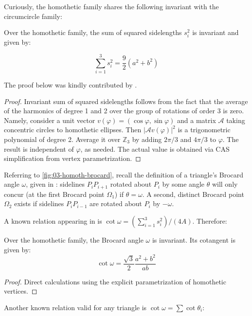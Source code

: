 Curiously, the homothetic family shares the following invariant with the circumcircle family:

\begin{proposition}
Over the homothetic family, the sum of squared sidelengths $s_i^2$ is invariant and given by:
	
\[ \sum_{i=1}^3 s_i^2=\frac{9}{2} \left(a^{2}+b^{2}\right) \]
\end{proposition}

The proof below was kindly contributed by  \cite{sergei2020-private-sidelengths}.

\begin{proof}
Invariant sum of squared sidelengths follows from the fact that the average of the harmonics of degree 1 and 2 over the group of rotations of order 3 is zero. Namely, consider a unit vector $v(\varphi)=(\cos \varphi, \sin \varphi)$ and a matrix $\mathcal{A}$ taking concentric circles to homothetic ellipses. Then $|\mathcal{A}v(\varphi)|^2$ is a trigonometric polynomial of degree 2. Average it over $\mathbb{Z}_3$ by adding $2\pi/3$ and $4\pi/3$ to $\varphi$. The result is independent of $\varphi$, as needed. The actual value is obtained via CAS simplification from vertex parametrization.
\end{proof}

Referring to \cref{fig:03-homoth-brocard}, recall the definition of a triangle's Brocard angle $\omega$, given in \cite[Brocard Angle]{mw}: sidelines $P_i P_{i+1}$ rotated about $P_i$ by some angle $\theta$ will only concur (at the first Brocard point $\Omega_1$) if $\theta=\omega$. A second, distinct Brocard point $\Omega_2$ exists if sidelines $P_i P_{i-1}$ are rotated about $P_{i}$ by $-\omega$.

A known relation appearing in \cite[Brocard Angle, Eqn. 2]{mw} is $\cot\omega=(\sum_{i=1}^3 s_i^2)/(4 A)$. Therefore:

\begin{corollary}
Over the homothetic family, the Brocard angle $\omega$ is invariant. Its cotangent is given by:
\[ \cot\omega=\frac{\sqrt{3}}{2} \frac{{a}^{2}+{b}^{2}}{a b} \]	
\end{corollary}

\begin{proof}
Direct calculations using the explicit parametrization of homothetic vertices.
\end{proof}

\noindent Another known relation valid for any triangle is $\cot\omega=\sum\cot\theta_i$:

